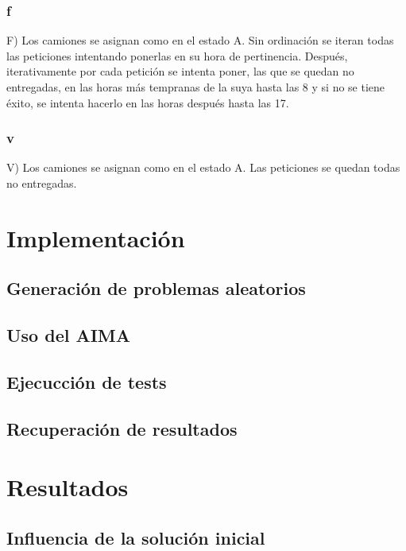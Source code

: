 \documentclass{article}
\begin{document}
\subsubsection{f}
F) Los camiones se asignan como en el estado A. Sin ordinación se iteran todas las peticiones intentando ponerlas en su hora de pertinencia. Después, iterativamente por cada petición se intenta poner, las que se quedan no entregadas, en las horas más tempranas de la suya hasta las 8 y si no se tiene éxito, se intenta hacerlo en las horas después hasta las 17.

\subsubsection{v}
V) Los camiones se asignan como en el estado A. Las peticiones se quedan todas no entregadas.


\section{Implementación}

\subsection{Generación de problemas aleatorios}

\subsection{Uso del AIMA}

\subsection{Ejecucción de tests}

\subsection{Recuperación de resultados}


\section{Resultados}

\subsection{Influencia de la solución inicial}
\end{document}
